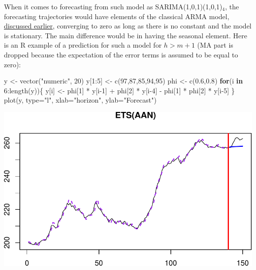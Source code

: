 \documentclass[
]{book}
\newenvironment{Shaded}{\begin{snugshade}}{\end{snugshade}}
\newcommand{\AttributeTok}[1]{\textcolor[rgb]{0.77,0.63,0.00}{#1}}
\newcommand{\ControlFlowTok}[1]{\textcolor[rgb]{0.13,0.29,0.53}{\textbf{#1}}}
\newcommand{\DecValTok}[1]{\textcolor[rgb]{0.00,0.00,0.81}{#1}}
\newcommand{\FloatTok}[1]{\textcolor[rgb]{0.00,0.00,0.81}{#1}}
\newcommand{\FunctionTok}[1]{\textcolor[rgb]{0.00,0.00,0.00}{#1}}
\newcommand{\NormalTok}[1]{#1}
\newcommand{\OtherTok}[1]{\textcolor[rgb]{0.56,0.35,0.01}{#1}}
\newcommand{\SpecialCharTok}[1]{\textcolor[rgb]{0.00,0.00,0.00}{#1}}
\newcommand{\StringTok}[1]{\textcolor[rgb]{0.31,0.60,0.02}{#1}}
\theoremstyle{definition}
\theoremstyle{definition}
\theoremstyle{definition}
\theoremstyle{definition}
\theoremstyle{remark}
\begin{document}
When it comes to forecasting from such model as SARIMA(1,0,1)(1,0,1)\(_4\), the forecasting trajectories would have elements of the classical ARMA model, \protect\hyperlink{ARMA}{discussed earlier}, converging to zero as long as there is no constant and the model is stationary. The main difference would be in having the seasonal element. Here is an R example of a prediction for such a model for \(h>m+1\) (MA part is dropped because the expectation of the error terms is assumed to be equal to zero):

\begin{Shaded}
\begin{Highlighting}[]
\NormalTok{y }\OtherTok{\textless{}{-}} \FunctionTok{vector}\NormalTok{(}\StringTok{"numeric"}\NormalTok{, }\DecValTok{20}\NormalTok{)}
\NormalTok{y[}\DecValTok{1}\SpecialCharTok{:}\DecValTok{5}\NormalTok{] }\OtherTok{\textless{}{-}} \FunctionTok{c}\NormalTok{(}\DecValTok{97}\NormalTok{,}\DecValTok{87}\NormalTok{,}\DecValTok{85}\NormalTok{,}\DecValTok{94}\NormalTok{,}\DecValTok{95}\NormalTok{)}
\NormalTok{phi }\OtherTok{\textless{}{-}} \FunctionTok{c}\NormalTok{(}\FloatTok{0.6}\NormalTok{,}\FloatTok{0.8}\NormalTok{)}
\ControlFlowTok{for}\NormalTok{(i }\ControlFlowTok{in} \DecValTok{6}\SpecialCharTok{:}\FunctionTok{length}\NormalTok{(y))\{}
\NormalTok{    y[i] }\OtherTok{\textless{}{-}}\NormalTok{ phi[}\DecValTok{1}\NormalTok{] }\SpecialCharTok{*}\NormalTok{ y[i}\DecValTok{{-}1}\NormalTok{] }\SpecialCharTok{+}\NormalTok{ phi[}\DecValTok{2}\NormalTok{] }\SpecialCharTok{*}\NormalTok{ y[i}\DecValTok{{-}4}\NormalTok{] }\SpecialCharTok{{-}}
\NormalTok{      phi[}\DecValTok{1}\NormalTok{] }\SpecialCharTok{*}\NormalTok{ phi[}\DecValTok{2}\NormalTok{] }\SpecialCharTok{*}\NormalTok{ y[i}\DecValTok{{-}5}\NormalTok{]}
\NormalTok{\}}
\FunctionTok{plot}\NormalTok{(y, }\AttributeTok{type=}\StringTok{"l"}\NormalTok{, }\AttributeTok{xlab=}\StringTok{"horizon"}\NormalTok{, }\AttributeTok{ylab=}\StringTok{"Forecast"}\NormalTok{)}
\end{Highlighting}
\end{Shaded}

\includegraphics{adam_files/figure-latex/unnamed-chunk-55-1.pdf}
\end{document}
